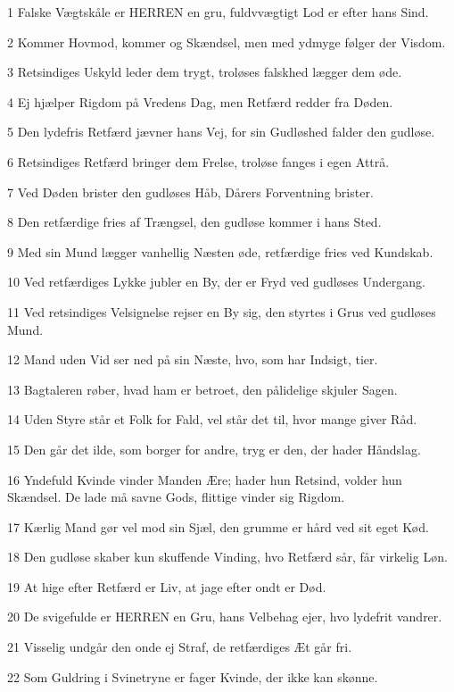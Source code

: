 \par 1 Falske Vægtskåle er HERREN en gru, fuldvvægtigt Lod er efter hans Sind.
\par 2 Kommer Hovmod, kommer og Skændsel, men med ydmyge følger der Visdom.
\par 3 Retsindiges Uskyld leder dem trygt, troløses falskhed lægger dem øde.
\par 4 Ej hjælper Rigdom på Vredens Dag, men Retfærd redder fra Døden.
\par 5 Den lydefris Retfærd jævner hans Vej, for sin Gudløshed falder den gudløse.
\par 6 Retsindiges Retfærd bringer dem Frelse, troløse fanges i egen Attrå.
\par 7 Ved Døden brister den gudløses Håb, Dårers Forventning brister.
\par 8 Den retfærdige fries af Trængsel, den gudløse kommer i hans Sted.
\par 9 Med sin Mund lægger vanhellig Næsten øde, retfærdige fries ved Kundskab.
\par 10 Ved retfærdiges Lykke jubler en By, der er Fryd ved gudløses Undergang.
\par 11 Ved retsindiges Velsignelse rejser en By sig, den styrtes i Grus ved gudløses Mund.
\par 12 Mand uden Vid ser ned på sin Næste, hvo, som har Indsigt, tier.
\par 13 Bagtaleren røber, hvad ham er betroet, den pålidelige skjuler Sagen.
\par 14 Uden Styre står et Folk for Fald, vel står det til, hvor mange giver Råd.
\par 15 Den går det ilde, som borger for andre, tryg er den, der hader Håndslag.
\par 16 Yndefuld Kvinde vinder Manden Ære; hader hun Retsind, volder hun Skændsel. De lade må savne Gods, flittige vinder sig Rigdom.
\par 17 Kærlig Mand gør vel mod sin Sjæl, den grumme er hård ved sit eget Kød.
\par 18 Den gudløse skaber kun skuffende Vinding, hvo Retfærd sår, får virkelig Løn.
\par 19 At hige efter Retfærd er Liv, at jage efter ondt er Død.
\par 20 De svigefulde er HERREN en Gru, hans Velbehag ejer, hvo lydefrit vandrer.
\par 21 Visselig undgår den onde ej Straf, de retfærdiges Æt går fri.
\par 22 Som Guldring i Svinetryne er fager Kvinde, der ikke kan skønne.
